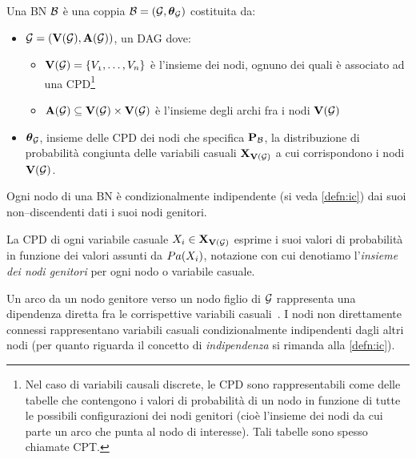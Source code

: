 \begin{definizione}[\acl{BN}]
\label{defn:bn}
Una \acl{BN} $\mathcal{B}$ è una coppia $\mathcal{B}=(\mathcal{G},\boldsymbol{\textbf{\text{$\theta$}}}_{\mathcal{G}})$ costituita da:
\begin{itemize}
    \item $\mathcal{G}=(\mathbf{V}(\mathcal{G}),\mathbf{A}(\mathcal{G}))$, un \acl{DAG} dove:
    \begin{itemize}
        \item $\mathbf{V}(\mathcal{G})=\{\mathnormal{V_1}, \dotsc, \mathnormal{V_n}\}$ è l'insieme dei nodi, ognuno dei quali è associato ad una \acf{CPD}\footnote{Nel caso di variabili causali discrete, le \acs{CPD} sono rappresentabili come delle tabelle che contengono i valori di probabilità di un nodo in funzione di tutte le possibili configurazioni dei nodi genitori (cioè l'insieme dei nodi da cui parte un arco che punta al nodo di interesse). Tali tabelle sono spesso chiamate \acf{CPT}.}
        \item $\mathbf{A}(\mathcal{G})\subseteq\mathbf{V}(\mathcal{G})\times\mathbf{V}(\mathcal{G})$ è l'insieme degli archi fra i nodi $\mathbf{V}(\mathcal{G})$
    \end{itemize}
    \item $\boldsymbol{\textbf{\text{$\theta$}}}_{\mathcal{G}}$, insieme delle \acs{CPD} dei nodi che specifica $\mathbf{P}_{\mathcal{B}}$, la distribuzione di probabilità congiunta delle variabili casuali $\mathbf{X}_{\mathbf{V}(\mathcal{G})}$ a cui corrispondono i nodi $\mathbf{V}(\mathcal{G})$.
\end{itemize}
\end{definizione}
\begin{osservazione}\label{oss:bn-markov-assumption}
Ogni nodo di una \acs{BN} è condizionalmente indipendente (si veda \autoref{defn:ic}) dai suoi non--discendenti dati i suoi nodi genitori.
\end{osservazione}

La \acs{CPD} di ogni variabile casuale $\mathnormal{X_i}\in\mathbf{X}_{\mathbf{V}(\mathcal{G})}$ esprime i suoi valori di probabilità in funzione dei valori assunti da $Pa(\mathnormal{X_i})$, notazione con cui denotiamo l'\emph{insieme dei nodi genitori} per ogni nodo o variabile casuale.

Un arco da un nodo genitore verso un nodo figlio di $\mathcal{G}$ rappresenta una dipendenza diretta fra le corrispettive variabili casuali~\citep[si veda][sezione 14.1]{Russel2003}. I nodi non direttamente connessi rappresentano variabili casuali condizionalmente indipendenti dagli altri nodi (per quanto riguarda il concetto di \emph{indipendenza \cond*{}} si rimanda alla \autoref{defn:ic}).


